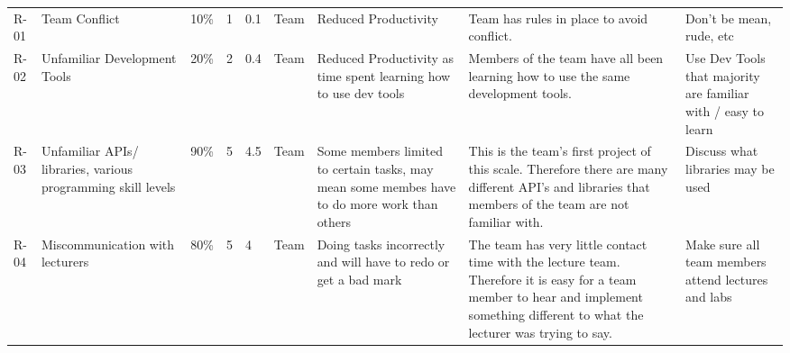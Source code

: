 \begin{tabular}{lllllllll}
R-01 & Team Conflict                                                              & 10\%                                                           & 1                                                        & 0.1                                                          & Team                & Reduced Productivity                                                                         & Team has rules in place to avoid conflict.                                                                                                                                                                                                                             & Don’t be mean, rude, etc                                                                         \\
R-02 & Unfamiliar Development Tools                                               & 20\%                                                           & 2                                                        & 0.4                                                          & Team                & Reduced Productivity as time spent learning how to use dev tools                             & Members of the team have all been learning how to use the same development tools.                                                                                                                                                                                      & Use Dev Tools that majority are familiar with / easy to learn                                    \\
R-03 & Unfamiliar APIs/ libraries, various programming skill levels               & 90\%                                                           & 5                                                        & 4.5                                                          & Team                & Some members limited to certain tasks, may mean some membes have to do more work than others & This is the team's first project of this scale. Therefore there are many different API’s and libraries that members of the team are not familiar with.                                                                                                                 & Discuss what libraries may be used                                                               \\
R-04 & Miscommunication with lecturers                                            & 80\%                                                           & 5                                                        & 4                                                            & Team                & Doing tasks incorrectly and will have to redo or get a bad mark                              & The team has very little contact time with the lecture team. Therefore it is easy for a team member to hear and implement something different to what the lecturer was trying to say.                                                                                  & Make sure all team members attend lectures and labs                                              \\

\end{tabular}
